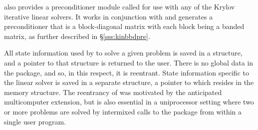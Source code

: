 {\kinsol} also provides a preconditioner module called {\kinbbdpre} for use
with any of the Krylov iterative linear solvers. It works in conjunction
with {\nvecp} and generates a preconditioner that is
a block-diagonal matrix with each block being a banded matrix, as
further described in \S\ref{sss:kinbbdpre}.

All state information used by {\kinsol} to solve a given problem is saved
in a structure, and a pointer to that structure is returned to the
user.  There is no global data in the {\kinsol} package, and so, in this
respect, it is reentrant. State information specific to the linear
solver is saved in a separate structure, a pointer to which resides in
the {\kinsol} memory structure. The reentrancy of {\kinsol} was motivated
by the anticipated multicomputer extension, but is also essential
in a uniprocessor setting where two or more problems are solved by
intermixed calls to the package from within a single user program.
